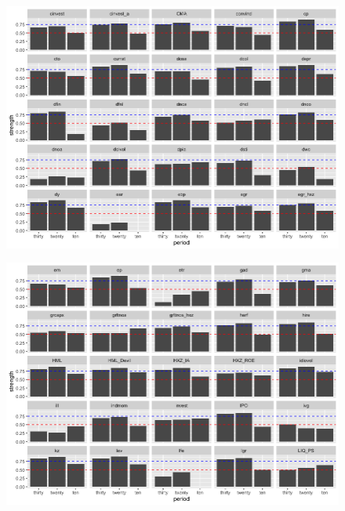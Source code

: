 \begin{landscape}
\begin{figure}[ht]
		\includegraphics[scale = 0.75]{strength_comparison_II}
		\centering
	\end{figure}
\end{landscape}

\begin{landscape}
	\begin{figure}[ht]
		\includegraphics[scale = 0.75]{strength_comparison_III}
		\centering
	\end{figure}
\end{landscape}

